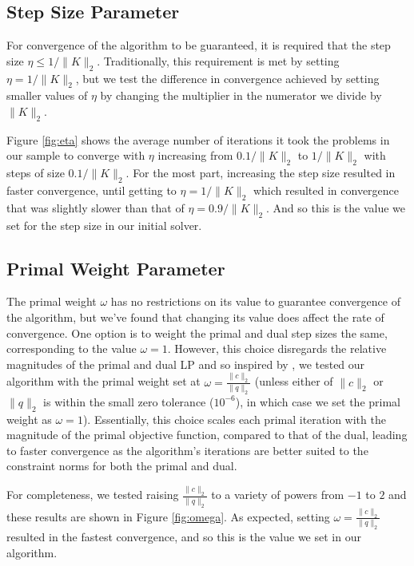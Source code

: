 \documentclass[twoside,12pt,openright]{report}  %
\begin{document}
\subsection{Step Size Parameter}
For convergence of the algorithm to be guaranteed, it is required that the step size $\eta \leq 1/\|K\|_2$. Traditionally, this requirement is met by setting $\eta=1/\|K\|_2$, but we test the difference in convergence achieved by setting smaller values of $\eta$ by changing the multiplier in the numerator we divide by $\|K\|_2$.

Figure \ref{fig:eta} shows the average number of iterations it took the problems in our sample to converge with $\eta$ increasing from $0.1/\|K\|_2$ to $1/\|K\|_2$ with steps of size $0.1/\|K\|_2$. For the most part, increasing the step size resulted in faster convergence, until getting to $\eta=1/\|K\|_2$ which resulted in convergence that was slightly slower than that of $\eta=0.9/\|K\|_2$. And so this is the value we set for the step size in our initial solver.
\subsection{Primal Weight Parameter}
The primal weight $\omega$ has no restrictions on its value to guarantee convergence of the algorithm, but we've found that changing its value does affect the rate of convergence. One option is to weight the primal and dual step sizes the same, corresponding to the value $\omega=1$. However, this choice disregards the relative magnitudes of the primal and dual LP and so inspired by \cite{applegate2}, we tested our algorithm with the primal weight set at $\omega =\frac{\|c\|_2}{\|q\|_2}$ (unless either of $\|c\|_2$ or $\|q\|_2$ is within the small zero tolerance ($10^{-6}$), in which case we set the primal weight as $\omega=1$). Essentially, this choice scales each primal iteration with the magnitude of the primal objective function, compared to that of the dual, leading to faster convergence as the algorithm's iterations are better suited to the constraint norms for both the primal and dual.

For completeness, we tested raising $\frac{\|c\|_2}{\|q\|_2}$ to a variety of powers from $-1$ to $2$ and these results are shown in Figure \ref{fig:omega}. As expected, setting $\omega=\frac{\|c\|_2}{\|q\|_2}$ resulted in the fastest convergence, and so this is the value we set in our algorithm.
\end{document}
